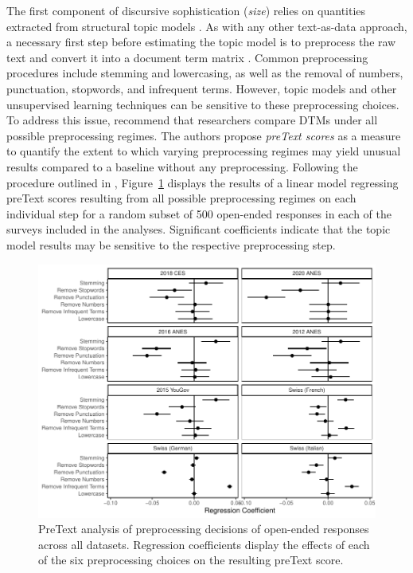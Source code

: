 \documentclass[12pt]{article}
\begin{document}
The first component of discursive sophistication (\textit{size}) relies on quantities extracted from structural topic models \citep{roberts2014structural}. As with any other text-as-data approach, a necessary first step before estimating the topic model is to preprocess the raw text and convert it into a document term matrix \citep[DTM, see for example][]{manning2008introduction}. Common preprocessing procedures include stemming and lowercasing, as well as the removal of numbers, punctuation, stopwords, and infrequent terms. However, topic models and other unsupervised learning techniques can be sensitive to these preprocessing choices. To address this issue, \citet{denny2018text} recommend that researchers compare DTMs under all possible preprocessing regimes. The authors propose \textit{preText scores} as a measure to quantify the extent to which varying preprocessing regimes may yield unusual results compared to a baseline without any preprocessing. Following the procedure outlined in \citet{denny2018text}, Figure~\ref{fig:pretext} displays the results of a linear model regressing preText scores resulting from all possible preprocessing regimes on each individual step for a random subset of 500 open-ended responses in each of the surveys included in the analyses. Significant coefficients indicate that the topic model results may be sensitive to the respective preprocessing step.

\begin{figure}[h]
	\centering\includegraphics[scale=.9]{../out/appC1-pretext.pdf}
	\caption[PreText analysis of preprocessing decisions of open-ended responses across all datasets]{PreText analysis of preprocessing decisions of open-ended responses across all datasets. Regression coefficients display the effects of each of the six preprocessing choices on the resulting preText score.}\label{fig:pretext}
\end{figure}
\end{document}
